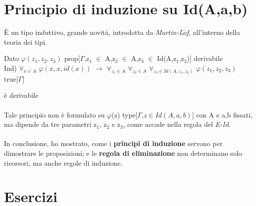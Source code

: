 \section{Principio di induzione su Id(A,a,b)}
\label{sec:principio-di-induzione-Id}
\`E un tipo induttivo, grande novit\`a, introdotta da \textit{Martin-L$\ddot{o}$f}, all'interno della teoria dei tipi.\\
\begin{center}Dato $\varphi(z_1,z_2,z_3)$ prop[$\Gamma$,z$_1$ $\in$ A,z$_2$ $\in$ A,z$_3$ $\in$ Id(A,z$_1$,z$_2$)] derivabile\\
Ind) $\forall_{x \in A}$ $\varphi(x,x,id(x))$ $\rightarrow$ $\forall_{z_1 \in A}$ $\forall_{z_2 \in A}$ $\forall_{z_3 \in Id(A,z_1,z_2)}$ $\varphi(z_1,z_2,z_3)$ true[$\Gamma$]\end{center} \`e derivabile\\\\
\noindent
Tale principio non \`e formulato su $\varphi$(z) type[$\Gamma$,$z \in Id(A,a,b)$] con A e a,b fissati, ma dipende da tre parametri z$_1$, z$_2$ e z$_3$, come accade nella regola del \textit{E-Id}.\\\\
\noindent In conclusione,  ho mostrato, come i \textbf{principi di induzione} servono per dimostrare le proposizioni; e le \textbf{regola di eliminazione} non determinano solo ricorsori, ma anche regole di induzione.

\section{Esercizi}
\label{sec:esercizi-principi-induzione}
